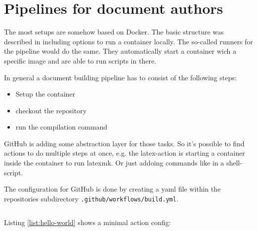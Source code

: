 \documentclass[final]{ltugboat}
\newcommand*{\file}[1]{\texttt{#1}}
\begin{document}
\section{Pipelines for document authors}

The most setups are somehow based on Docker.
The basic structure was described in \cite{islandoftex-docker} including options to run a container locally.
The so-called runners for the pipeline would do the same. They automatically start a container wich a specific image and are able to run scripts in there.

In general a document building pipeline has to consist of the following steps:

\begin{itemize}
\item Setup the container
\item checkout the repository
\item run the compilation command
\end{itemize}

GitHub is adding some abstraction layer for those tasks.
So it's possible to find actions to do multiple steps at once, e.g. the latex-action \cite{latex-action} is starting a container inside the container to run latexmk. Or just addoing commands like in a shell-script.

The configuration for GitHub is done by creating a yaml file within the repositories subdirectory \file{.github/workflows/build.yml}.

\inputminted[linenos]{yaml}{examples/hello-world.yml}

Listing \ref{list:hello-world} shows a minimal action config:
\end{document}
